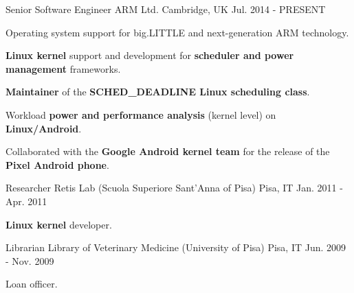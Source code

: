 

\begin{cventries}

  \cventry
    {Senior Software Engineer} %
    {ARM Ltd.} %
    {Cambridge, UK} %
    {Jul. 2014 - PRESENT} %
    {
      \begin{cvitems} %
        \item {Operating system support for big.LITTLE and next-generation ARM technology.}
	\item {\textbf{Linux kernel} support and development for \textbf{scheduler and power management} frameworks.}
        \item {\textbf{Maintainer} of the \textbf{SCHED\_DEADLINE Linux scheduling class}.}
	\item {Workload \textbf{power and performance analysis} (kernel level) on \textbf{Linux/Android}.}
	\item {Collaborated with the \textbf{Google Android kernel team} for the
		release of the \textbf{Pixel Android phone}.}
      \end{cvitems}
    }

  \cventry
    {Researcher} %
    {Retis Lab (Scuola Superiore Sant'Anna of Pisa)} %
    {Pisa, IT} %
    {Jan. 2011 - Apr. 2011} %
    {
      \begin{cvitems} %
	\item {\textbf{Linux kernel} developer.}
      \end{cvitems}
    }

  \cventry
    {Librarian} %
    {Library of Veterinary Medicine (University of Pisa)} %
    {Pisa, IT} %
    {Jun. 2009 - Nov. 2009} %
    {
      \begin{cvitems} %
	\item {Loan officer.}
      \end{cvitems}
    }


\end{cventries}
